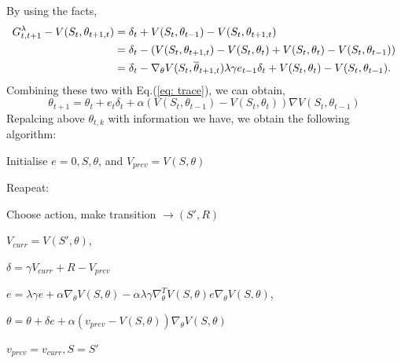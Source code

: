 \documentclass[11pt,a4paper]{article}
\def\bar{\overline}
\begin{document}
By using the facts,
\begin{equation}
    \aligned 
    G_{t,t+1}^\lambda - V(S_t, \theta_{t+1,t}) & = \delta_t + V(S_t, \theta_{t-1}) - V(S_t, \theta_{t+1,t}) \\
    & = \delta_t - \left(V(S_t, \theta_{t+1,t}) - V(S_t, \theta_{t}) + V(S_t, \theta_t) - V(S_t, \theta_{t-1})\right) \\ 
    & = \delta_t - \nabla_\theta V(S_t, \bar{\theta}_{t+1,t}) \lambda \gamma e_{t-1} \delta_t + V(S_t, \theta_t) - V(S_t, \theta_{t-1}).
    \endaligned 
\end{equation}
Combining these two with Eq.(\ref{eq: trace}), we can obtain,
\begin{equation}
    \theta_{t+1} = \theta_t + e_t \delta_t + \alpha (V(S_t, \theta_{t-1}) - V(S_t, \theta_t))\nabla V(S_t, \theta_{t-1})
\end{equation}
Repalcing above $\theta_{t, k}$ with information we have, we obtain the following algorithm:
\begin{tcolorbox}[title=On-line eligibility trace with approximator]
    Initialise $e = 0, S, \theta$, and $V_{prev} = V(S,\theta)$ \par
    Reapeat:\par
    \hspace{1cm} Choose action, make transition $\rightarrow (S', R)$ \par
    \hspace{1cm} $V_{curr} = V(S',\theta)$, \par
    \hspace{1cm} $\delta = \gamma V_{curr} + R - V_{prev}$ \par
    \hspace{1cm} $e = \lambda\gamma e + \alpha \nabla_{\theta} V(S, \theta) - \alpha \lambda\gamma \nabla_{\theta}^TV(S,\theta)e\nabla_{\theta}V(S, \theta)$, \par
    \hspace{1cm} $\theta = \theta + \delta e + \alpha (v_{prev} - V(S, \theta)) \nabla_{\theta} V(S,\theta)$ \par
    \hspace{1cm} $v_{prev} = v_{curr}, S= S'$
\end{tcolorbox}
\end{document}
